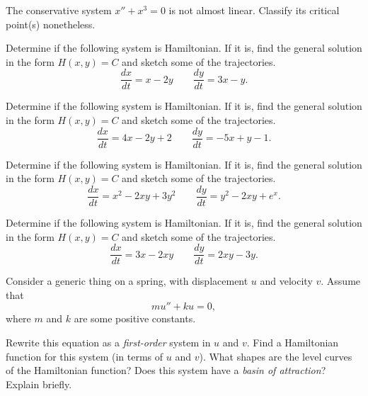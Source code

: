 \begin{exercise}\ansMark%
The conservative system $x''+x^3 = 0$ is not almost linear.  Classify
its critical point(s) nonetheless.
\end{exercise}

\begin{exercise}
Determine if the following system is Hamiltonian. If it is, find the general solution in the form $H(x,y) = C$ and sketch some of the trajectories.
\[ \frac{dx}{dt} = x - 2y \qquad \frac{dy}{dt} = 3x - y.\]
\end{exercise}

\begin{exercise}
Determine if the following system is Hamiltonian. If it is, find the general solution in the form $H(x,y) = C$ and sketch some of the trajectories.
\[ \frac{dx}{dt} = 4x - 2y + 2 \qquad \frac{dy}{dt} = -5x + y - 1.\]
\end{exercise}


\begin{exercise}
Determine if the following system is Hamiltonian. If it is, find the general solution in the form $H(x,y) = C$ and sketch some of the trajectories.
\[ \frac{dx}{dt} = x^2 - 2xy + 3y^2 \qquad \frac{dy}{dt} = y^2 - 2xy + e^x .\]
\end{exercise}


\begin{exercise}
Determine if the following system is Hamiltonian. If it is, find the general solution in the form $H(x,y) = C$ and sketch some of the trajectories.
\[ \frac{dx}{dt} = 3x - 2xy \qquad \frac{dy}{dt} = 2xy - 3y.\]
\end{exercise}

\begin{exercise} Consider a generic thing on a spring, with displacement $u$ and velocity $v$. Assume that $$mu''+ku=0,$$ where $m$ and $k$ are some positive constants.
\begin{tasks}
\task Rewrite this equation as a {\it first-order} system in $u$ and $v$.
\task Find a Hamiltonian function for this system (in terms of $u$ and $v$).
\task What shapes are the level curves of the Hamiltonian function? 
\task Does this system have a {\it basin of attraction}? Explain briefly. 
\end{tasks}
\end{exercise}

